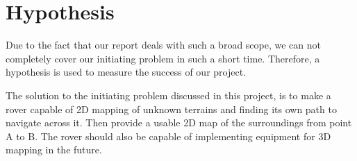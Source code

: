 \clearpage
\section{Hypothesis}

Due to the fact that our report deals with such a broad scope, we can not completely cover our initiating problem in such a short time. Therefore, a hypothesis is used to measure the success of our project. 

The solution to the initiating problem discussed in this project, is to make a rover capable of 2D mapping of unknown terrains and finding its own path to navigate across it. Then provide a usable 2D map of the surroundings from point A to B. The rover should also be capable of implementing equipment for 3D mapping in the future.
